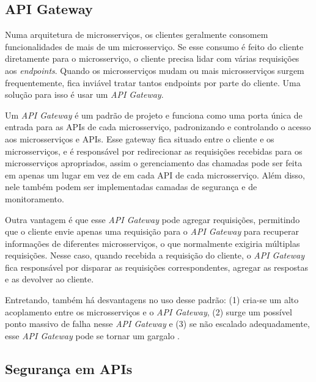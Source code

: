 
\subsection{API Gateway}\label{boas-praticas-api-gateway}
Numa arquitetura de microsserviços, os clientes geralmente consomem funcionalidades de mais de um microsserviço. Se esse consumo é feito do cliente diretamente para o microsserviço, o cliente precisa lidar com várias requisições aos \emph{endpoints}. Quando os microsserviços mudam ou mais microsserviços surgem frequentemente, fica inviável tratar tantos endpoints por parte do cliente. Uma solução para isso é usar um \emph{API Gateway}. 

Um \emph{API Gateway} é um padrão de projeto e funciona como uma porta única de entrada para as APIs de cada microsserviço, padronizando e controlando o acesso aos microsserviços e APIs. Esse gateway fica situado entre o cliente e os microsserviços, e é responsável por redirecionar as requisições recebidas para os microsserviços apropriados, assim o gerenciamento das chamadas pode ser feita em apenas um lugar em vez de em cada API de cada microsserviço. Além disso, nele também podem ser implementadas camadas de segurança e de monitoramento.

Outra vantagem é que esse \emph{API Gateway} pode agregar requisições, permitindo que o cliente envie apenas uma requisição para o \emph{API Gateway} para recuperar informações de diferentes microsserviços, o que normalmente exigiria múltiplas requisições. Nesse caso, quando recebida a requisição do cliente, o \emph{API Gateway} fica responsável por disparar as requisições correspondentes, agregar as respostas e as devolver ao cliente.

Entretando, também há desvantagens no uso desse padrão: (1) cria-se um alto acoplamento entre os microsserviços e o \emph{API Gateway}, (2) surge um possível ponto massivo de falha nesse \emph{API Gateway} e (3) se não escalado adequadamente, esse \emph{API Gateway} pode se tornar um gargalo \cite{microsoft-api-gateway}.

\subsection{Segurança em APIs}

